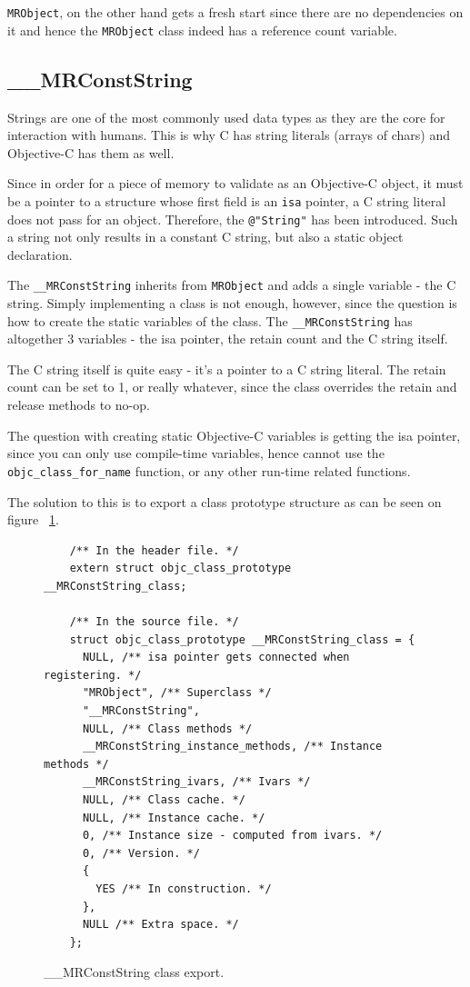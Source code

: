 \verb=MRObject=, on the other hand gets a fresh start since there are no dependencies on it and hence the \verb=MRObject= class indeed has a reference count variable.

\subsection{\_\_MRConstString}

Strings are one of the most commonly used data types as they are the core for interaction with humans. This is why C has string literals (arrays of chars) and Objective-C has them as well.

Since in order for a piece of memory to validate as an Objective-C object, it must be a pointer to a structure whose first field is an \verb=isa= pointer, a C string literal does not pass for an object. Therefore, the \verb=@"String"= has been introduced. Such a string not only results in a constant C string, but also a static object declaration.

The \verb=__MRConstString= inherits from \verb=MRObject= and adds a single variable - the C string. Simply implementing a class is not enough, however, since the question is how to create the static variables of the class. The \verb=__MRConstString= has altogether 3 variables - the isa pointer, the retain count and the C string itself.

The C string itself is quite easy - it's a pointer to a C string literal. The retain count can be set to 1, or really whatever, since the class overrides the retain and release methods to no-op.

The question with creating static Objective-C variables is getting the isa pointer, since you can only use compile-time variables, hence cannot use the \verb=objc_class_for_name= function, or any other run-time related functions.

The solution to this is to export a class prototype structure as can be seen on figure ~\ref{fig:mr_const_str_export}.

\begin{figure}[H]
  \begin{verbatim}
    /** In the header file. */
    extern struct objc_class_prototype __MRConstString_class;
    
    /** In the source file. */
    struct objc_class_prototype __MRConstString_class = {
      NULL, /** isa pointer gets connected when registering. */
      "MRObject", /** Superclass */
      "__MRConstString",
      NULL, /** Class methods */
      __MRConstString_instance_methods, /** Instance methods */
      __MRConstString_ivars, /** Ivars */
      NULL, /** Class cache. */
      NULL, /** Instance cache. */
      0, /** Instance size - computed from ivars. */
      0, /** Version. */
      {
        YES /** In construction. */
      },
      NULL /** Extra space. */
    };
  \end{verbatim}
  \centering{}
  \caption{\_\_MRConstString class export.}
  \label{fig:mr_const_str_export}
\end{figure}

